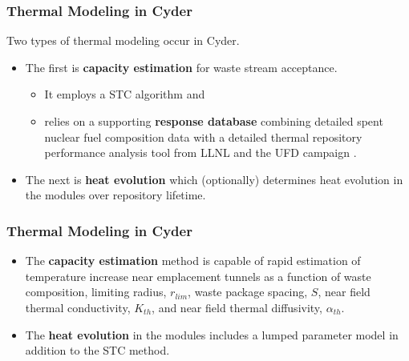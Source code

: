 
\begin{frame}[ctb!]
\frametitle{Thermal Modeling in Cyder}
Two types of thermal modeling occur in Cyder. 
\begin{itemize}
\item The first is \textbf{capacity estimation} for waste stream acceptance.
\begin{itemize}
\item It employs a \gls{STC} algorithm \cite{radel_effect_2007, radel_repository_2007} and
\item relies on a supporting \textbf{response database} combining detailed 
spent nuclear fuel composition data \cite{carter_fuel_2011} with a detailed 
thermal repository performance analysis tool from \gls{LLNL} and the \gls{UFD} 
campaign \cite{greenberg_application_2012}.  
\end{itemize}
\item The next is \textbf{heat evolution} which (optionally) determines heat evolution in 
the modules over repository lifetime.
\end{itemize}
\end{frame}


\begin{frame}[ctb!]
\frametitle{Thermal Modeling in Cyder}
\begin{itemize}
\item The \textbf{capacity estimation} method is capable of rapid estimation of 
temperature increase near emplacement tunnels as a function of waste 
composition, limiting radius, $r_{lim}$, waste package spacing, $S$, near field 
thermal conductivity, $K_{th}$, and near field thermal diffusivity, 
$\alpha_{th}$.

\item The \textbf{heat evolution} in the modules includes a lumped parameter 
model in addition to the \gls{STC} method.
\end{itemize}

\end{frame}


